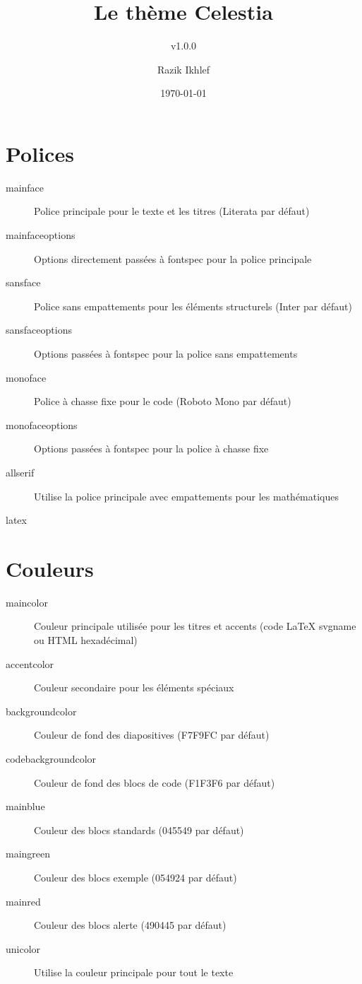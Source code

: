 \documentclass[french]{neoschool}
\title{Le thème Celestia}
\subtitle{v1.0.0}
\author{Razik Ikhlef}
\date{\today}
\begin{document}
\maketitle

\section{Polices}
\begin{description}
\item[mainface] Police principale pour le texte et les titres (\textcolor{titleColor}{Literata} par défaut)
\item[mainfaceoptions] Options directement passées à \textcolor{titleColor}{fontspec} pour la police principale
\item[sansface] Police sans empattements pour les éléments structurels (\textcolor{titleColor}{Inter} par défaut)
\item[sansfaceoptions] Options passées à \textcolor{titleColor}{fontspec} pour la police sans empattements
\item[monoface] Police à chasse fixe pour le code (\textcolor{titleColor}{Roboto Mono} par défaut)
\item[monofaceoptions] Options passées à \textcolor{titleColor}{fontspec} pour la police à chasse fixe
\item[allserif] Utilise la police principale avec empattements pour les mathématiques
\end{description}

\begin{code}{latex}
\end{code}

\section{Couleurs}
\begin{description}
\item[maincolor] Couleur principale utilisée pour les titres et accents (code \textcolor{titleColor}{LaTeX} svgname ou \textcolor{titleColor}{HTML} hexadécimal)
\item[accentcolor] Couleur secondaire pour les éléments spéciaux
\item[backgroundcolor] Couleur de fond des diapositives (\textcolor{titleColor}{F7F9FC} par défaut)
\item[codebackgroundcolor] Couleur de fond des blocs de code (\textcolor{titleColor}{F1F3F6} par défaut)
\item[mainblue] Couleur des blocs standards (\textcolor{titleColor}{045549} par défaut)
\item[maingreen] Couleur des blocs exemple (\textcolor{titleColor}{054924} par défaut)
\item[mainred] Couleur des blocs alerte (\textcolor{titleColor}{490445} par défaut)
\item[unicolor] Utilise la couleur principale pour tout le texte
\end{description}
\end{document}
